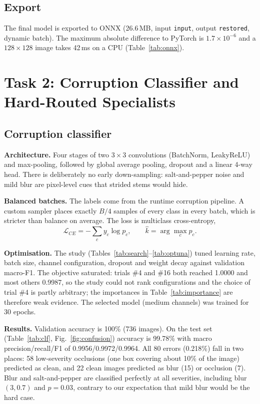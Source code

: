 \documentclass[conference]{IEEEtran}
\begin{document}
\subsection{Export}
The final model is exported to ONNX (26.6\,MB, input \texttt{input}, output \texttt{restored}, dynamic batch). The maximum absolute difference to PyTorch is $1.7\times10^{-6}$ and a $128{\times}128$ image takes 42\,ms on a CPU (Table~\ref{tab:onnx}).

\section{Task 2: Corruption Classifier and Hard-Routed Specialists}
\subsection{Corruption classifier}
\textbf{Architecture.} Four stages of two $3{\times}3$ convolutions (BatchNorm, LeakyReLU) and max-pooling, followed by global average pooling, dropout and a linear 4-way head. There is deliberately no early down-sampling: salt-and-pepper noise and mild blur are pixel-level cues that strided stems would hide.

\textbf{Balanced batches.} The labels come from the runtime corruption pipeline. A custom sampler places exactly $B/4$ samples of every class in every batch, which is stricter than balance on average. The loss is multiclass cross-entropy,
\begin{equation}
\mathcal{L}_{CE}=-\sum_c y_c\log p_c,\qquad \hat k=\arg\max_c p_c.
\end{equation}

\textbf{Optimisation.} The study (Tables~\ref{tab:search}--\ref{tab:optuna}) tuned learning rate, batch size, channel configuration, dropout and weight decay against validation macro-F1. The objective saturated: trials \#4 and \#16 both reached 1.0000 and most others 0.9987, so the study could not rank configurations and the choice of trial \#4 is partly arbitrary; the importances in Table~\ref{tab:importance} are therefore weak evidence. The selected model (medium channels) was trained for 30 epochs.

\textbf{Results.} Validation accuracy is 100\% (736 images). On the test set (Table~\ref{tab:clf}, Fig.~\ref{fig:confusion}) accuracy is 99.78\% with macro precision/recall/F1 of 0.9956/0.9972/0.9964. All 80 errors (0.218\%) fall in two places: 58 low-severity occlusions (one box covering about 10\% of the image) predicted as clean, and 22 clean images predicted as blur (15) or occlusion (7). Blur and salt-and-pepper are classified perfectly at all severities, including blur $(3,0.7)$ and $p=0.03$, contrary to our expectation that mild blur would be the hard case.
\end{document}
